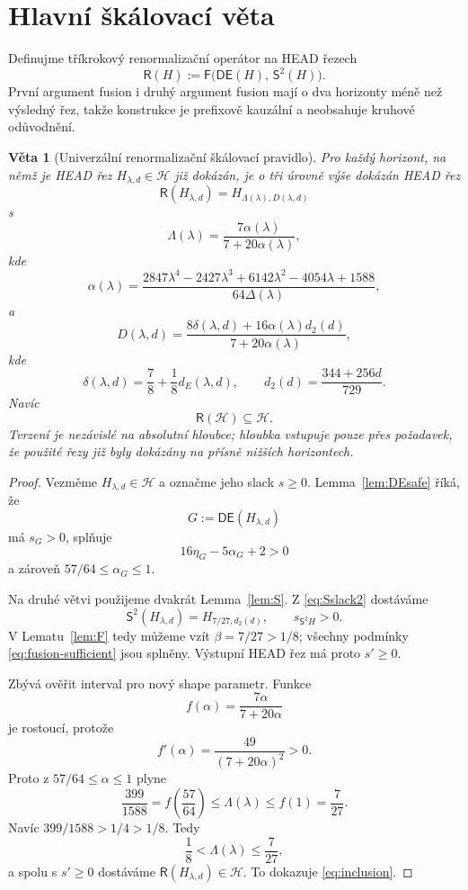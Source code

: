 \documentclass[11pt,a4paper]{article}
\newtheorem{theorem}{Věta}
\theoremstyle{remark}
\newcommand{\HH}{\mathcal H}
\newcommand{\Eop}{\mathsf E}
\newcommand{\Dop}{\mathsf D}
\newcommand{\Sop}{\mathsf S}
\newcommand{\Fop}{\mathsf F}
\newcommand{\Rop}{\mathsf R}
\begin{document}
\section{Hlavní škálovací věta}

Definujme tříkrokový renormalizační operátor na HEAD řezech
\begin{equation}\label{eq:Rdef}
\boxed{
\Rop(H):=
\Fop\bigl(\Dop\Eop(H),\,\Sop^2(H)\bigr).}
\end{equation}
První argument fusion i druhý argument fusion mají o dva horizonty méně než
výsledný řez, takže konstrukce je prefixově kauzální a neobsahuje kruhové
odůvodnění.

\begin{theorem}[Univerzální renormalizační škálovací pravidlo]\label{thm:scaling}
Pro každý horizont, na němž je HEAD řez $H_{\lambda,d}\in\HH$ již dokázán,
je o tři úrovně výše dokázán HEAD řez
\[
\Rop(H_{\lambda,d})=H_{\Lambda(\lambda),D(\lambda,d)}
\]
s
\begin{equation}\label{eq:Lambda}
\boxed{
\Lambda(\lambda)
=\frac{7\alpha(\lambda)}{7+20\alpha(\lambda)},}
\end{equation}
kde
\begin{equation}\label{eq:alpha-explicit}
\alpha(\lambda)
=\frac{2847\lambda^4-2427\lambda^3+6142\lambda^2-4054\lambda+1588}
{64\Delta(\lambda)},
\end{equation}
a
\begin{equation}\label{eq:Dmap}
\boxed{
D(\lambda,d)
=
\frac{8\delta(\lambda,d)+16\alpha(\lambda)d_2(d)}
{7+20\alpha(\lambda)},}
\end{equation}
kde
\[
\delta(\lambda,d)=\frac78+\frac18d_E(\lambda,d),
\qquad
d_2(d)=\frac{344+256d}{729}.
\]
Navíc
\begin{equation}\label{eq:inclusion}
\boxed{\Rop(\HH)\subseteq\HH.}
\end{equation}
Tvrzení je nezávislé na absolutní hloubce; hloubka vstupuje pouze přes
požadavek, že použité řezy již byly dokázány na přísně nižších horizontech.
\end{theorem}

\begin{proof}
Vezměme $H_{\lambda,d}\in\HH$ a označme jeho slack $s\ge0$.
Lemma~\ref{lem:DEsafe} říká, že
\[
G:=\Dop\Eop(H_{\lambda,d})
\]
má $s_G>0$, splňuje
\[
16\eta_G-5\alpha_G+2>0
\]
a zároveň $57/64\le\alpha_G\le1$.

Na druhé větvi použijeme dvakrát Lemma~\ref{lem:S}. Z
\eqref{eq:Sslack2} dostáváme
\[
\Sop^2(H_{\lambda,d})=H_{7/27,d_2(d)},
\qquad s_{\Sop^2H}>0.
\]
V Lematu~\ref{lem:F} tedy můžeme vzít $\beta=7/27>1/8$; všechny podmínky
\eqref{eq:fusion-sufficient} jsou splněny. Výstupní HEAD řez má proto
$s'\ge0$.

Zbývá ověřit interval pro nový shape parametr. Funkce
\[
f(\alpha)=\frac{7\alpha}{7+20\alpha}
\]
je rostoucí, protože
\[
f'(\alpha)=\frac{49}{(7+20\alpha)^2}>0.
\]
Proto z $57/64\le\alpha\le1$ plyne
\[
\frac{399}{1588}
=f\!\left(\frac{57}{64}\right)
\le\Lambda(\lambda)
\le f(1)=\frac7{27}.
\]
Navíc $399/1588>1/4>1/8$. Tedy
\[
\frac18<\Lambda(\lambda)\le\frac7{27},
\]
a spolu s $s'\ge0$ dostáváme
$\Rop(H_{\lambda,d})\in\HH$. To dokazuje \eqref{eq:inclusion}.
\end{proof}
\end{document}
